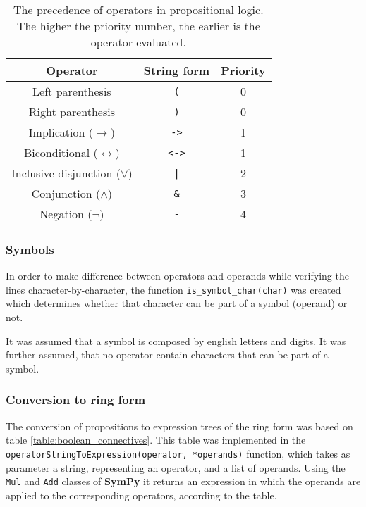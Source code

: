 \begin{table}[h!]
\centering
\begin{tabular}{ ccc } 
 \hline
 Operator & String form & Priority \\ 
 \hline
 Left parenthesis & \verb|(| & 0 \\ 
 Right parenthesis & \verb|)| & 0 \\ 
 Implication ($\rightarrow$) & \verb|->| & 1 \\ 
 Biconditional ($\leftrightarrow$) & \verb|<->| & 1 \\ 
 Inclusive disjunction ($\lor$) & \verb+|+ & 2 \\ 
 Conjunction ($\land$)  & \verb|&| & 3 \\ 
 Negation ($\neg$) & \verb|-| & 4 \\ 
 \hline
\end{tabular}
\caption{The precedence of operators in propositional logic. The higher the priority number, the earlier is the operator evaluated.}
\label{table:operator_prec}
\end{table}

\subsubsection{Symbols}

In order to make difference between operators and operands while verifying the lines character-by-character, the function \verb|is_symbol_char(char)| was created which determines whether that character can be part of a symbol (operand) or not. 

It was assumed that a symbol is composed by english letters and digits. It was further assumed, that no operator contain characters that can be part of a symbol.

\subsubsection{Conversion to ring form}

The conversion of propositions to expression trees of the ring form was based on table \ref{table:boolean_connectives}. This table was implemented in the \verb|operatorStringToExpression(operator, *operands)| function, which takes as parameter a string, representing an operator, and a list of operands. Using the \verb|Mul| and \verb|Add| classes of \textbf{SymPy} it returns an expression in which the operands are applied to the corresponding operators, according to the table.




